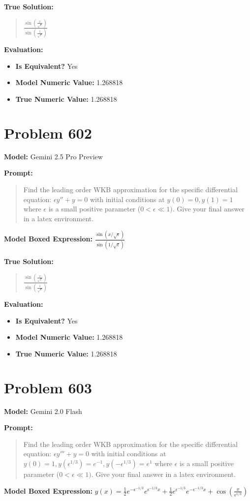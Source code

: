 \documentclass{article}
\begin{document}
\textbf{True Solution:}
\begin{quote}
$\frac{\sin \left(\frac{x}{\sqrt{\epsilon}}\right)}{\sin \left(\frac{1}{\sqrt{\epsilon}}\right)}$
\end{quote}

\textbf{Evaluation:}
\begin{itemize}
\item \textbf{Is Equivalent?} Yes
\item \textbf{Model Numeric Value:} 1.268818
\item \textbf{True Numeric Value:} 1.268818
\end{itemize}
\vspace{1cm}
\section*{Problem 602}
\textbf{Model:} Gemini 2.5 Pro Preview

\textbf{Prompt:}
\begin{quote}
Find the leading order WKB approximation for the specific differential equation: $\epsilon y'' + y = 0$ with initial conditions at $y(0) = 0, y(1) = 1$ where $\epsilon$ is a small positive parameter ($0 < \epsilon \ll 1)$. Give your final answer in a \boxed latex environment.
\end{quote}
\textbf{Model Boxed Expression:} $\frac{\sin(x/\sqrt{\epsilon})}{\sin(1/\sqrt{\epsilon})}$

\textbf{True Solution:}
\begin{quote}
$\frac{\sin \left(\frac{x}{\sqrt{\epsilon}}\right)}{\sin \left(\frac{1}{\sqrt{\epsilon}}\right)}$
\end{quote}

\textbf{Evaluation:}
\begin{itemize}
\item \textbf{Is Equivalent?} Yes
\item \textbf{Model Numeric Value:} 1.268818
\item \textbf{True Numeric Value:} 1.268818
\end{itemize}
\vspace{1cm}
\section*{Problem 603}
\textbf{Model:} Gemini 2.0 Flash

\textbf{Prompt:}
\begin{quote}
Find the leading order WKB approximation for the specific differential equation: $\epsilon y''' + y = 0$ with initial conditions at $y(0) = 1, y(\epsilon^{1/3}) = e^{-1}, y(-\epsilon^{1/3}) = e^{1} $ where $\epsilon$ is a small positive parameter ($0 < \epsilon \ll 1)$. Give your final answer in a \boxed latex environment.
\end{quote}
\textbf{Model Boxed Expression:} $y(x) = \frac{1}{2} e^{-\epsilon^{-1/3}} e^{\epsilon^{-1/3} x} + \frac{1}{2} e^{\epsilon^{-1/3}} e^{-\epsilon^{-1/3} x} + \cos\left(\frac{x}{\epsilon^{1/3}}\right)$
\end{document}
